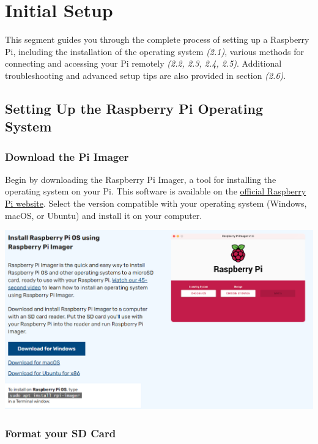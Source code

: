\documentclass[
  letterpaper,
]{scrbook}
\begin{document}
\hypertarget{initial-setup}{%
\chapter{Initial Setup}\label{initial-setup}}

This segment guides you through the complete process of setting up a
Raspberry Pi, including the installation of the operating system
\emph{(2.1)}, various methods for connecting and accessing your Pi
remotely \emph{(2.2, 2.3, 2.4, 2.5)}. Additional troubleshooting and
advanced setup tips are also provided in section \emph{(2.6)}.

\hypertarget{setting-up-the-raspberry-pi-operating-system}{%
\section{Setting Up the Raspberry Pi Operating
System}\label{setting-up-the-raspberry-pi-operating-system}}

\hypertarget{download-the-pi-imager}{%
\subsection{Download the Pi Imager}\label{download-the-pi-imager}}

Begin by downloading the Raspberry Pi Imager, a tool for installing the
operating system on your Pi. This software is available on the
\href{https://www.raspberrypi.com/software/}{official Raspberry Pi
website}. Select the version compatible with your operating system
(Windows, macOS, or Ubuntu) and install it on your computer.

\includegraphics{content/material/ch2/raspi_imager.png}

\hypertarget{format-your-sd-card}{%
\subsection{Format your SD Card}\label{format-your-sd-card}}
\end{document}
